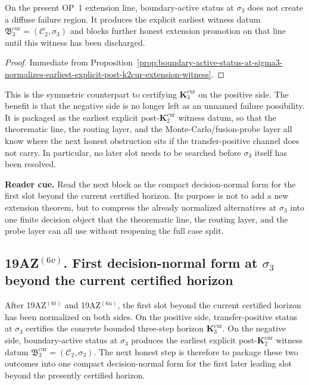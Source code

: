 \begin{corollary}
\label{cor:negative-channel-at-sigma3-is-earliest-explicit-witness-beyond-k2cur}
On the present OP~1 extension line, boundary-active status at $\sigma_3$ does not create a diffuse failure region. It produces the explicit earliest witness datum $\mathfrak B_3^{\mathrm{cur}}=(\mathcal C_2,\sigma_3)$ and blocks further honest extension promotion on that line until this witness has been discharged.
\end{corollary}

\begin{proof}
Immediate from Proposition~\ref{prop:boundary-active-status-at-sigma3-normalizes-earliest-explicit-post-k2cur-extension-witness}.
\end{proof}

\begin{remark}
\label{rem:what-explicitly-normalizing-boundary-active-channel-at-sigma3-now-buys}
This is the symmetric counterpart to certifying $\mathbf K_3^{\mathrm{cur}}$ on the positive side. The benefit is that the negative side is no longer left as an unnamed failure possibility. It is packaged as the earliest explicit post-$\mathbf K_2^{\mathrm{cur}}$ witness datum, so that the theorematic line, the routing layer, and the Monte-Carlo/fusion-probe layer all know where the next honest obstruction sits if the transfer-positive channel does not carry. In particular, no later slot needs to be searched before $\sigma_3$ itself has been resolved.
\end{remark}


\noindent\textbf{Reader cue.} Read the next block as the compact decision-normal form for the first slot beyond the current certified horizon. Its purpose is not to add a new extension theorem, but to compress the already normalized alternatives at $\sigma_3$ into one finite decision object that the theorematic line, the routing layer, and the probe layer can all use without reopening the full case split.

\subsection*{19AZ$^{(6v)}$. First decision-normal form at $\sigma_3$ beyond the current certified horizon}
\label{sec:first-decision-normal-form-at-sigma3-beyond-current-certified-horizon}
After 19AZ$^{(6t)}$ and 19AZ$^{(6u)}$, the first slot beyond the current certified horizon has been normalized on both sides. On the positive side, transfer-positive status at $\sigma_3$ certifies the concrete bounded three-step horizon $\mathbf K_3^{\mathrm{cur}}$. On the negative side, boundary-active status at $\sigma_3$ produces the earliest explicit post-$\mathbf K_2^{\mathrm{cur}}$ witness datum $\mathfrak B_3^{\mathrm{cur}}=(\mathcal C_2,\sigma_3)$. The next honest step is therefore to package these two outcomes into one compact decision-normal form for the first later leading slot beyond the presently certified horizon.

